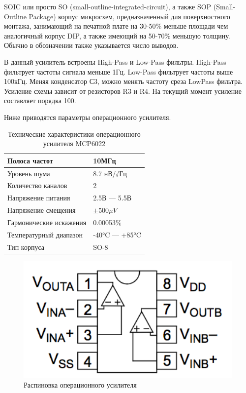 \documentclass[14pt]{extarticle}
\begin{document}
SOIC или просто SO (small-outline-integrated-circuit), а также SOP (Small-Outline Package) корпус микросхем, предназначенный для поверхностного монтажа, занимающий на печатной плате на 30-50\% меньше площади чем аналогичный корпус DIP, а также имеющий на 50-70\% меньшую толщину. Обычно в обозначении также указывается число выводов.

В данный усилитель встроены High-Pass и Low-Pass фильтры. High-Pass фильтрует частоты сигнала меньше 1Гц. Low-Pass фильтрует частоты выше 100кГц. Меняя конденсатор С3, можно менять частоту среза LowPass фильтра. Усиление схемы зависит от резисторов R3 и R4. На текущий момент усиление составляет порядка 100.

Ниже приводятся параметры операционного усилителя.

\begin{table}[h]
\centering
\label{my-label}
\begin{tabular}{|l|l|}
\hline
Полоса частот                  & 10МГц                      \\ \hline
Уровень шума                   & 8.7 нВ/√Гц                 \\ \hline
Количество каналов             & 2                          \\ \hline
Напряжение питания             & 2.5В --- 5.5В              \\ \hline
Напряжение смещения            & $\pm500\mu V $             \\ \hline
Гармонические искажения        & 0.00053\%                  \\ \hline
Температурный диапазон         & -40°C --- +85°C            \\ \hline
Тип корпуса                    & SO-8                       \\ \hline
\end{tabular}
\caption{Технические характеристики операционного усилителя MCP6022}
\end{table}

\begin{figure}[H]
\centering
\includegraphics[width=12cm]{images/op-amp.png}
\caption{Распиновка операционного усилителя}
\end{figure}
\end{document}
